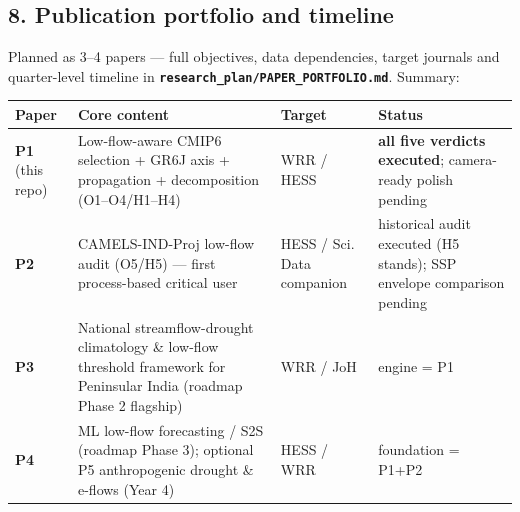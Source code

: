 \documentclass[
  english,
  11pt,
]{article}
\newcounter{none} %
\begin{document}
\subsection{8. Publication portfolio and
timeline}\label{publication-portfolio-and-timeline}

Planned as 3--4 papers --- full objectives, data dependencies, target
journals and quarter-level timeline in
\textbf{\texttt{research\_plan/PAPER\_PORTFOLIO.md}}. Summary:

{\def\LTcaptype{none} %
\begin{longtable}[]{@{}
  >{\raggedright\arraybackslash}p{}
  >{\raggedright\arraybackslash}p{}
  >{\raggedright\arraybackslash}p{}
  >{\raggedright\arraybackslash}p{}@{}}
\toprule\noalign{}
\begin{minipage}[b]{\linewidth}\raggedright
Paper
\end{minipage} & \begin{minipage}[b]{\linewidth}\raggedright
Core content
\end{minipage} & \begin{minipage}[b]{\linewidth}\raggedright
Target
\end{minipage} & \begin{minipage}[b]{\linewidth}\raggedright
Status
\end{minipage} \\
\midrule\noalign{}
\endhead
\bottomrule\noalign{}
\endlastfoot
\textbf{P1} (this repo) & Low-flow-aware CMIP6 selection + GR6J axis +
propagation + decomposition (O1--O4/H1--H4) & WRR / HESS & \textbf{all
five verdicts executed}; camera-ready polish pending \\
\textbf{P2} & CAMELS-IND-Proj low-flow audit (O5/H5) --- first
process-based critical user & HESS / Sci. Data companion & historical
audit executed (H5 stands); SSP envelope comparison pending \\
\textbf{P3} & National streamflow-drought climatology \& low-flow
threshold framework for Peninsular India (roadmap Phase 2 flagship) &
WRR / JoH & engine = P1 \\
\textbf{P4} & ML low-flow forecasting / S2S (roadmap Phase 3); optional
P5 anthropogenic drought \& e-flows (Year 4) & HESS / WRR & foundation =
P1+P2 \\
\end{longtable}
}
\end{document}
